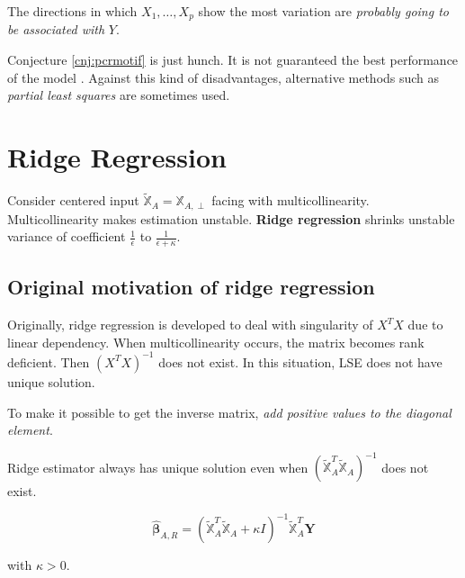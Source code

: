 \documentclass[]{book}
\theoremstyle{definition}
\theoremstyle{definition}
\theoremstyle{definition}
\theoremstyle{remark}
\let\BeginKnitrBlock\begin \let\EndKnitrBlock\end
\begin{document}
\BeginKnitrBlock{conjecture}[Key idea of PCR]
\protect\hypertarget{cnj:pcrmotif}{}{\label{cnj:pcrmotif} {} }The directions in which \(X_1, \ldots, X_p\) show the most variation are \textit{probably going to be associated with} \(Y\).
\EndKnitrBlock{conjecture}

Conjecture \ref{cnj:pcrmotif} is just hunch. It is not guaranteed the best performance of the model \citep{James:2013aa}. Against this kind of disadvantages, alternative methods such as \emph{partial least squares} are sometimes used.

\hypertarget{ridge-regression}{%
\section{Ridge Regression}\label{ridge-regression}}

Consider centered input \(\widetilde{\mathbb{X}}_A = \mathbb{X}_{A, \perp}\) facing with multicollinearity. Multicollinearity makes estimation unstable. \textbf{Ridge regression} shrinks unstable variance of coefficient \(\frac{1}{\epsilon}\) to \(\frac{1}{\epsilon + \kappa}\).

\hypertarget{original-motivation-of-ridge-regression}{%
\subsection{Original motivation of ridge regression}\label{original-motivation-of-ridge-regression}}

Originally, ridge regression is developed to deal with singularity of \(X^T X\) due to linear dependency. When multicollinearity occurs, the matrix becomes rank deficient. Then \((X^T X)^{-1}\) does not exist. In this situation, LSE does not have unique solution.

To make it possible to get the inverse matrix, \emph{add positive values to the diagonal element}.

\BeginKnitrBlock{remark}[Ridge estimator]
{}Ridge estimator always has unique solution even when \((\widetilde{\mathbb{X}}_A^T \widetilde{\mathbb{X}}_A)^{-1}\) does not exist.

\begin{equation}
  \boldsymbol{\hat\beta}_{A, R} = (\widetilde{\mathbb{X}}_A^T \widetilde{\mathbb{X}}_A + \kappa I)^{-1}\widetilde{\mathbb{X}}_A^T \mathbf{Y}
  \label{eq:ridgemotif}
\end{equation}

with \(\kappa > 0\).
\EndKnitrBlock{remark}
\end{document}
